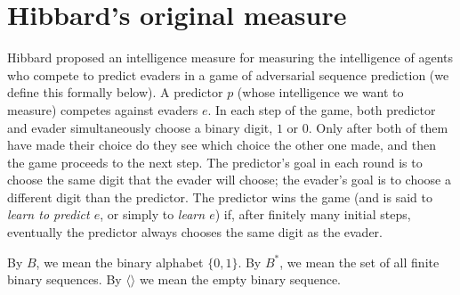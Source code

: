 \documentclass[twoside,11pt]{article}
\begin{document}
\section{Hibbard's original measure}
\label{originalmeasuresection}

Hibbard proposed an intelligence measure for measuring the intelligence
of agents who compete to predict evaders in a game of
adversarial sequence prediction (we define this
formally below). A predictor $p$ (whose intelligence we want to measure)
competes against evaders $e$. In each step of the game,
both predictor and evader simultaneously choose a binary digit, $1$ or $0$.
Only after both of them have made their choice do they see which choice the other
one made, and then the game proceeds to the next step. The predictor's goal in
each round is to choose the same digit that the evader will choose;
the evader's goal is to choose a different digit than the predictor. The predictor
wins the game (and is said to \emph{learn to predict $e$}, or simply to
\emph{learn $e$}) if, after finitely many
initial steps, eventually the predictor always chooses the same digit as the
evader.

\begin{definition}
By $B$, we mean the binary alphabet $\{0,1\}$. By $B^*$, we mean the set of all
finite binary sequences. By $\langle\rangle$ we mean the empty binary sequence.
\end{definition}
\end{document}
